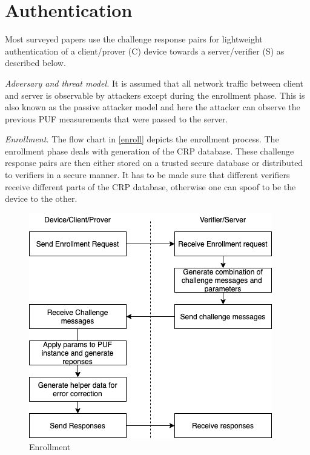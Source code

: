 \documentclass[journal, a4paper]{IEEEtran}
\begin{document}
\section{Authentication}
Most surveyed papers use the challenge response pairs for lightweight authentication of a client/prover (C) device towards a server/verifier (S) as described below.

\textit{Adversary and threat model.} It is assumed that all network traffic between client and server is observable by attackers except during the enrollment phase. This is also known as the passive attacker model and here the attacker can observe the previous PUF measurements that were passed to the server.

\textit{Enrollment.} The flow chart in \ref{enroll} depicts the enrollment process. The enrollment phase deals with generation of the CRP database. These challenge response pairs are then either stored on a trusted secure database or distributed to verifiers in a secure manner. It has to be made sure that different verifiers receive different parts of the CRP database, otherwise one can spoof to be the device to the other.

\begin{figure}[!hbt]
    \begin{center}
    \includegraphics[width=\columnwidth]{figs/enrollment.png}
    \caption{Enrollment}
    \label{fig:enroll}
    \end{center}
\end{figure}
\end{document}
